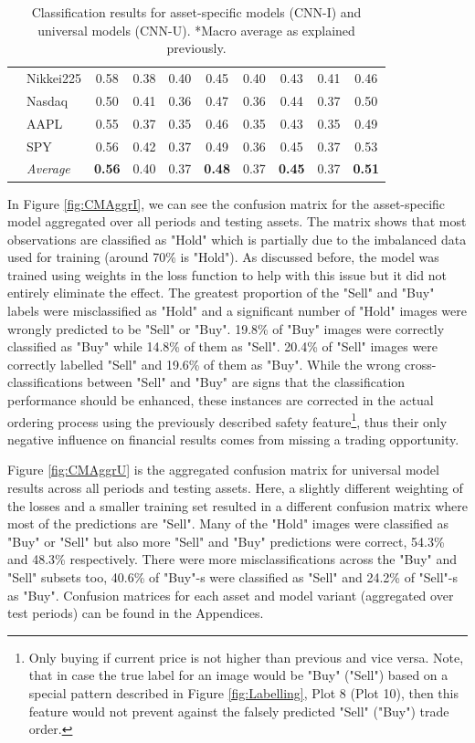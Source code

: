 \documentclass[12pt, a4paper]{article}
\begin{document}
\begin{table}[H]
\begin{tabular}{l|l|cc|cc|cc|cc}
& Nikkei225        & 0.58          & 0.38 & 0.40 & 0.45          & 0.40 & 0.43          & 0.41 & 0.46          \\
& Nasdaq           & 0.50          & 0.41 & 0.36 & 0.47          & 0.36 & 0.44          & 0.37 & 0.50          \\
& AAPL             & 0.55          & 0.37 & 0.35 & 0.46          & 0.35 & 0.43          & 0.35 & 0.49          \\
& SPY              & 0.56          & 0.42 & 0.37 & 0.49          & 0.36 & 0.45          & 0.37 & 0.53          \\ \cline{2-10}
& \textit{Average} & \textbf{0.56} & 0.40 & 0.37 & \textbf{0.48} & 0.37 & \textbf{0.45} & 0.37 & \textbf{0.51}
\end{tabular}
\caption{Classification results for asset-specific models (CNN-I) and universal models (CNN-U). *Macro average as explained previously.}
\label{tbl:ClassRes}
\end{table}

In Figure \ref{fig:CMAggrI}, we can see the confusion matrix for the asset-specific model aggregated over all periods and testing assets. The matrix shows that most observations are classified as "Hold" which is partially due to the imbalanced data used for training (around 70\% is "Hold"). As discussed before, the model was trained using weights in the loss function to help with this issue but it did not entirely eliminate the effect. The greatest proportion of the "Sell" and "Buy" labels were misclassified as "Hold" and a significant number of "Hold" images were wrongly predicted to be "Sell" or "Buy". 19.8\% of "Buy" images were correctly classified as "Buy" while 14.8\% of them as "Sell". 20.4\% of "Sell" images were correctly labelled "Sell" and 19.6\% of them as "Buy". While the wrong cross-classifications between "Sell" and "Buy" are signs that the classification performance should be enhanced, these instances are corrected in the actual ordering process using the previously described safety feature\footnote{Only buying if current price is not higher than previous and vice versa. Note, that in case the true label for an image would be "Buy" ("Sell") based on a special pattern described in Figure \ref{fig:Labelling}, Plot 8 (Plot 10), then this feature would not prevent against the falsely predicted "Sell" ("Buy") trade order.}, thus their only negative influence on financial results comes from missing a trading opportunity.

Figure \ref{fig:CMAggrU} is the aggregated confusion matrix for universal model results across all periods and testing assets. Here, a slightly different weighting of the losses and a smaller training set resulted in a different confusion matrix where most of the predictions are "Sell". Many of the "Hold" images were classified as "Buy" or "Sell" but also more "Sell" and "Buy" predictions were correct, 54.3\% and 48.3\% respectively. There were more misclassifications across the "Buy" and "Sell" subsets too, 40.6\% of "Buy"-s were classified as "Sell" and 24.2\% of "Sell"-s as "Buy". Confusion matrices for each asset and model variant (aggregated over test periods) can be found in the Appendices.
\end{document}
